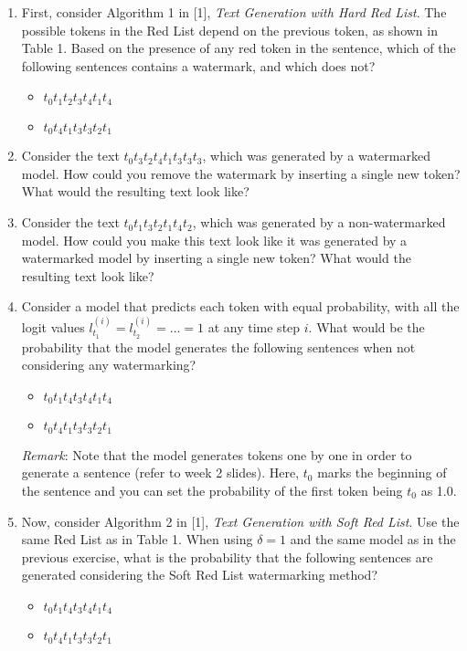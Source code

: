 \documentclass{article}
\begin{document}
\begin{enumerate}[label=(E.\arabic*)]
    \item First, consider Algorithm 1 in [1], \textit{Text Generation with Hard Red List}. The possible tokens in the Red List depend on the previous token, as shown in Table 1. Based on the presence of any red token in the sentence, which of the following sentences contains a watermark, and which does not?
          \begin{itemize}
              \item $t_0t_1t_2t_3t_4t_1t_4$
              \item $t_0t_4t_1t_3t_3t_2t_1$
          \end{itemize}

    \item Consider the text $t_0t_3t_2t_4t_1t_3t_3t_3$, which was generated by a watermarked model. How could you remove the watermark by inserting a single new token? What would the resulting text look like?

    \item Consider the text $t_0t_1t_3t_2t_1t_4t_2$, which was generated by a non-watermarked model. How could you make this text look like it was generated by a watermarked model by inserting a single new token? What would the resulting text look like?

    \item Consider a model that predicts each token with equal probability, with all the logit values $l_{t_1}^{(i)} = l_{t_2}^{(i)} = \ldots = 1$ at any time step $i$. What would be the probability that the model generates the following sentences when not considering any watermarking?
          \begin{itemize}
              \item $t_0t_1t_4t_3t_4t_1t_4$
              \item $t_0t_4t_1t_3t_3t_2t_1$
          \end{itemize}

          \textit{Remark}: Note that the model generates tokens one by one in order to generate a sentence (refer to week 2 slides). Here, $t_0$ marks the beginning of the sentence and you can set the probability of the first token being $t_0$ as 1.0.

    \item Now, consider Algorithm 2 in [1], \textit{Text Generation with Soft Red List}. Use the same Red List as in Table 1. When using $\delta = 1$ and the same model as in the previous exercise, what is the probability that the following sentences are generated considering the Soft Red List watermarking method?
          \begin{itemize}
              \item $t_0t_1t_4t_3t_4t_1t_4$
              \item $t_0t_4t_1t_3t_3t_2t_1$
          \end{itemize}
\end{enumerate}
\end{document}
